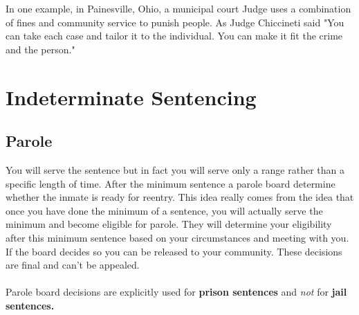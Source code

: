 \documentclass[10pt]{article}
\begin{document}
In one example, in Painesville, Ohio, a municipal court Judge uses a combination of fines and community service to punish people. As Judge Chiccineti said "You can take each case and tailor it to the individual. You can make it fit the crime and the person."

\section*{Indeterminate Sentencing}
\subsection*{Parole}
You will serve the sentence but in fact you will serve only a range rather than a specific length of time. After the minimum sentence a parole board determine whether the inmate is ready for reentry. This idea really comes from the idea that once you have done the minimum of a sentence, you will actually serve the minimum and become eligible for parole. They will determine your eligibility after this minimum sentence based on your circumstances and meeting with you. If the board decides so you can be released to your community. These decisions are final and can't be appealed.\\\\
Parole board decisions are explicitly used for \textbf{prison sentences} and \textit{not} for \textbf{jail sentences.}\\
\end{document}
